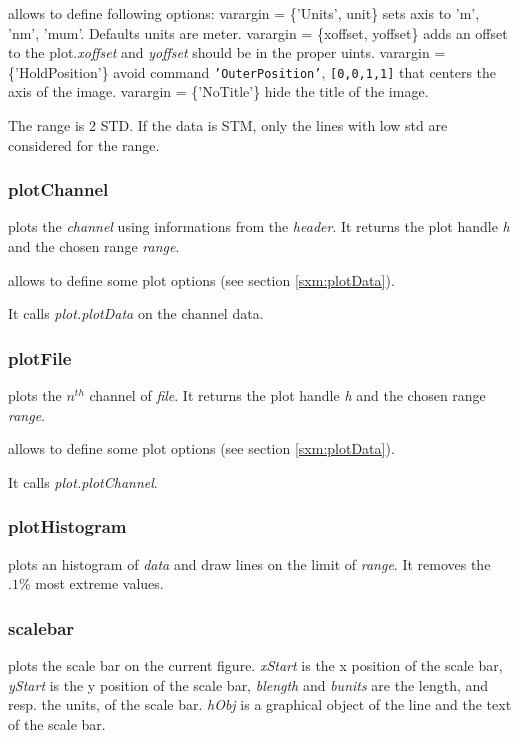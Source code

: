  allows to define following options:
\bi
\+ varargin = \{'Units', unit\} sets axis to 'm', 'nm', 'mum'. Defaults units are meter.
\+ varargin = \{xoffset, yoffset\} adds an offset to the plot.\emph{xoffset} and \emph{yoffset} should be in the proper uints.
\+ varargin = \{'HoldPosition'\} avoid command \texttt{'OuterPosition'}, \newline \texttt{[0,0,1,1]} that centers the axis of the image.
\+ varargin = \{'NoTitle'\} hide the title of the image.
\ei
\edf

The range is 2 STD. If the data is STM, only the lines with low std are considered for the range.
\subsubsection{plotChannel}
\bdf
{} plots the \emph{channel} using informations from the \emph{header}. It returns the plot handle \emph{h} and the chosen range \emph{range}.

 allows to define some plot options (see section \ref{sxm:plotData}).
\edf

It calls \emph{plot.plotData} on the channel data.

\subsubsection{plotFile}

\bdf
{} plots the $n^{th}$ channel of \emph{file}. It returns the plot handle \emph{h} and the chosen range \emph{range}.

 allows to define some plot options (see section \ref{sxm:plotData}).
\edf

It calls \emph{plot.plotChannel}.

\subsubsection{plotHistogram}
\bdf
{} plots an histogram of \emph{data} and draw lines on the limit of \emph{range}. It removes the $.1\%$ most extreme values. 
\edf

\subsubsection{scalebar}
\bdf
{} plots the scale bar on the current figure. \emph{xStart} is the x position of the scale bar, \emph{yStart} is the y position of the scale bar, \emph{blength} and \emph{bunits} are the length, and resp. the units, of the scale bar. \emph{hObj} is a graphical object of the line and the text of the scale bar. 

